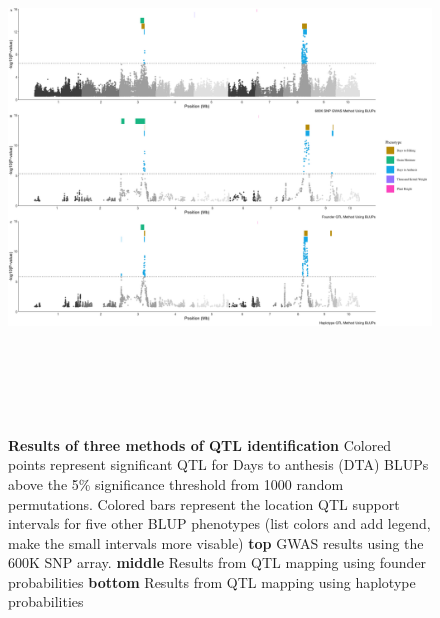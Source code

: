 \documentclass[article,9pt,twocolumn,twoside]{rilabRxiv}
\begin{document}
\begin{figure}[ht!]
\includegraphics[width=\textwidth,height=14cm]{figures/Methods_Fig3_alltraits.png}
\caption{\textbf{Results of three methods of QTL identification} Colored points represent significant QTL for Days to anthesis (DTA) BLUPs above the 5\% significance threshold from 1000 random permutations. Colored bars represent the location QTL support intervals for five other BLUP phenotypes (list colors and add legend, make the small intervals more visable) \textbf{top} GWAS results using the 600K SNP array. \textbf{middle} Results from QTL mapping using founder probabilities \textbf{bottom} Results from QTL mapping using haplotype probabilities}
\label{fig:figure3}
\end{figure}
\end{document}

